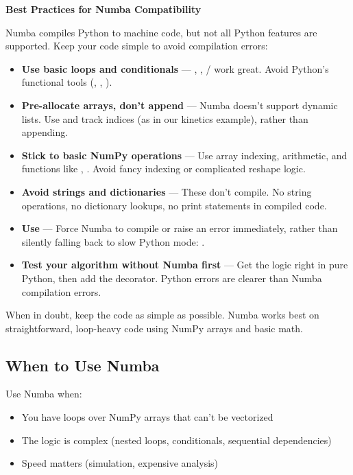 \begin{tip}
\textbf{Best Practices for Numba Compatibility}

Numba compiles Python to machine code, but not all Python features are supported. Keep your code simple to avoid compilation errors:

\begin{itemize}
    \item \textbf{Use basic loops and conditionals} --- , , / work great. Avoid Python's functional tools (, , ).

    \item \textbf{Pre-allocate arrays, don't append} --- Numba doesn't support dynamic lists. Use  and track indices (as in our kinetics example), rather than appending.

    \item \textbf{Stick to basic NumPy operations} --- Use array indexing, arithmetic, and functions like , . Avoid fancy indexing or complicated reshape logic.

    \item \textbf{Avoid strings and dictionaries} --- These don't compile. No string operations, no dictionary lookups, no print statements in compiled code.

    \item \textbf{Use } --- Force Numba to compile or raise an error immediately, rather than silently falling back to slow Python mode: .

    \item \textbf{Test your algorithm without Numba first} --- Get the logic right in pure Python, then add the decorator. Python errors are clearer than Numba compilation errors.
\end{itemize}

When in doubt, keep the code as simple as possible. Numba works best on straightforward, loop-heavy code using NumPy arrays and basic math.
\end{tip}

\subsection{When to Use Numba}

Use Numba when:
\begin{itemize}
    \item You have loops over NumPy arrays that can't be vectorized
    \item The logic is complex (nested loops, conditionals, sequential dependencies)
    \item Speed matters (simulation, expensive analysis)
\end{itemize}

